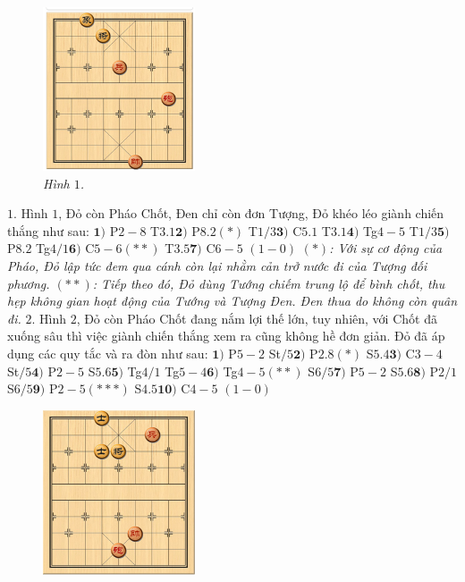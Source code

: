 \begin{multicols}{2}
	\begin{figure}[H]
		\vspace*{-5pt}
		\centering
		\captionsetup{labelformat= empty, justification=centering}
		\includegraphics[width= 0.4\textwidth]{1}
		\caption{\small\textit{\color{gocco}Hình $1$.}}
		\vspace*{-10pt}
	\end{figure}
	$1.$	Hình $1$, Đỏ còn Pháo Chốt, Đen chỉ còn đơn Tượng, Đỏ khéo léo giành chiến thắng như sau: 
	\vskip 0.1cm
	$\pmb{1)}$	P$2-8$ T$3.1$\quad $\pmb{2)}$ P$8.2(*)$ T$1/3$\quad $\pmb{3)}$ C$5.1$ T$3.1$\quad $\pmb{4)}$ Tg$4-5$ T$1/3$\quad $\pmb{5)}$ P$8.2$ Tg$4/1$\quad $\pmb{6)}$ C$5-6(**)$ T$3.5$\quad $\pmb{7)}$ C$6-5$ $(1-0)$
	\vskip 0.1cm
	\textit{$(*)$: Với sự cơ động của Pháo, Đỏ lập tức đem qua cánh còn lại nhằm cản trở nước đi của Tượng đối phương.
	\vskip 0.1cm
	$(**)$: Tiếp theo đó, Đỏ dùng Tướng chiếm trung lộ để bình chốt, thu hẹp không gian hoạt động của Tướng và Tượng Đen. Đen thua do không còn quân đi.}
	\vskip 0.1cm
	$2.$	Hình $2$, Đỏ còn Pháo Chốt đang nắm lợi thế lớn, tuy nhiên, với Chốt đã xuống sâu thì việc giành chiến thắng xem ra cũng không hề đơn giản. Đỏ đã áp dụng các quy tắc và ra đòn như sau:
	\vskip 0.1cm
	$\pmb{1)}$	P$5-2$ St$/5$\quad $\pmb{2)}$ P$2.8(*)$ S$5.4$\quad $\pmb{3)}$ C$3-4$ St$/5$\quad $\pmb{4)}$ P$2-5$ S$5.6$\quad $\pmb{5)}$ Tg$4/1$ Tg$5-4$\quad $\pmb{6)}$ Tg$4-5(**)$ S$6/5$\quad $\pmb{7)}$ P$5-2$ S$5.6$\quad $\pmb{8)}$ P$2/1$ S$6/5$\quad $\pmb{9)}$ P$2-5(***)$ S$4.5$\quad $\pmb{10)}$ C$4-5$ $(1-0)$
	\begin{figure}[H]
		\vspace*{5pt}
		\centering
		\captionsetup{labelformat= empty, justification=centering}
		\includegraphics[width= 0.4\textwidth]{2}

\end{figure}
\end{multicols}
